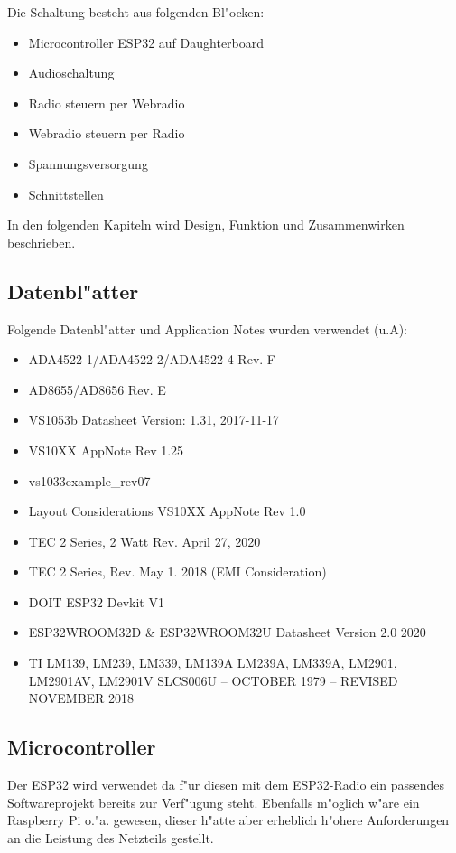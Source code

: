 \documentclass[ngerman,11pt,parskip=half] {scrartcl}
\begin{document}
Die Schaltung besteht aus folgenden Bl"ocken:
\begin{itemize}
\item Microcontroller ESP32 auf Daughterboard
\item Audioschaltung
\item Radio steuern per Webradio
\item Webradio steuern per Radio
\item Spannungsversorgung
\item Schnittstellen
\end{itemize}

In den folgenden Kapiteln wird Design, Funktion und Zusammenwirken beschrieben.

\subsection{Datenbl"atter} \label{sec:schaltung:datenblaetter}

Folgende Datenbl"atter und Application Notes wurden verwendet (u.A):
\begin{itemize}
\item ADA4522-1/ADA4522-2/ADA4522-4 Rev. F
\item AD8655/AD8656 Rev. E
\item VS1053b Datasheet Version: 1.31, 2017-11-17
\item VS10XX AppNote Rev 1.25
\item vs1033example\_rev07
\item Layout Considerations VS10XX AppNote Rev 1.0
\item TEC 2 Series, 2 Watt Rev. April 27, 2020
\item TEC 2 Series, Rev. May 1. 2018 (EMI Consideration)
\item DOIT ESP32 Devkit V1
\item ESP32­WROOM­32D \& ESP32­WROOM­32U Datasheet Version 2.0 2020
\item TI LM139, LM239, LM339, LM139A LM239A, LM339A, LM2901, LM2901AV, LM2901V  SLCS006U – OCTOBER 1979 – REVISED NOVEMBER 2018
\end{itemize}

\subsection{Microcontroller} \label{sec:schaltung:Microcontroller}

Der ESP32 wird verwendet da f"ur diesen mit dem ESP32-Radio ein passendes Softwareprojekt bereits zur Verf"ugung steht. Ebenfalls m"oglich w"are ein Raspberry Pi o."a. gewesen, dieser h"atte aber erheblich h"ohere Anforderungen an die Leistung des Netzteils gestellt.\\
\end{document}
